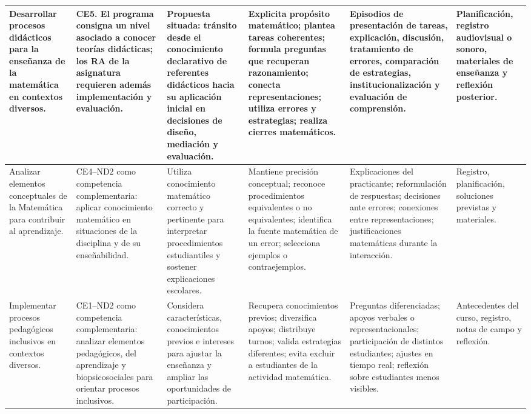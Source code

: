 \documentclass[11pt,a4paper]{article}
\begin{document}
\begin{landscape}
\begin{longtable}{p{3.0cm}p{3.0cm}p{4.2cm}p{4.2cm}p{5.0cm}p{3.2cm}}
Desarrollar procesos didácticos para la enseñanza de la matemática en contextos diversos. &
CE5. El programa consigna un nivel asociado a conocer teorías didácticas; los RA de la asignatura requieren además implementación y evaluación. &
\textbf{Propuesta situada:} tránsito desde el conocimiento declarativo de referentes didácticos hacia su aplicación inicial en decisiones de diseño, mediación y evaluación. &
Explicita propósito matemático; plantea tareas coherentes; formula preguntas que recuperan razonamiento; conecta representaciones; utiliza errores y estrategias; realiza cierres matemáticos. &
Episodios de presentación de tareas, explicación, discusión, tratamiento de errores, comparación de estrategias, institucionalización y evaluación de comprensión. &
Planificación, registro audiovisual o sonoro, materiales de enseñanza y reflexión posterior.\\
\midrule

Analizar elementos conceptuales de la Matemática para contribuir al aprendizaje. &
CE4--ND2 como competencia complementaria: aplicar conocimiento matemático en situaciones de la disciplina y de su enseñabilidad. &
Utiliza conocimiento matemático correcto y pertinente para interpretar procedimientos estudiantiles y sostener explicaciones escolares. &
Mantiene precisión conceptual; reconoce procedimientos equivalentes o no equivalentes; identifica la fuente matemática de un error; selecciona ejemplos o contraejemplos. &
Explicaciones del practicante; reformulación de respuestas; decisiones ante errores; conexiones entre representaciones; justificaciones matemáticas durante la interacción. &
Registro, planificación, soluciones previstas y materiales.\\
\midrule

Implementar procesos pedagógicos inclusivos en contextos diversos. &
CE1--ND2 como competencia complementaria: analizar elementos pedagógicos, del aprendizaje y biopsicosociales para orientar procesos inclusivos. &
Considera características, conocimientos previos e intereses para ajustar la enseñanza y ampliar las oportunidades de participación. &
Recupera conocimientos previos; diversifica apoyos; distribuye turnos; valida estrategias diferentes; evita excluir a estudiantes de la actividad matemática. &
Preguntas diferenciadas; apoyos verbales o representacionales; participación de distintos estudiantes; ajustes en tiempo real; reflexión sobre estudiantes menos visibles. &
Antecedentes del curso, registro, notas de campo y reflexión.\\
\midrule


\end{longtable}
\end{landscape}
\end{document}
